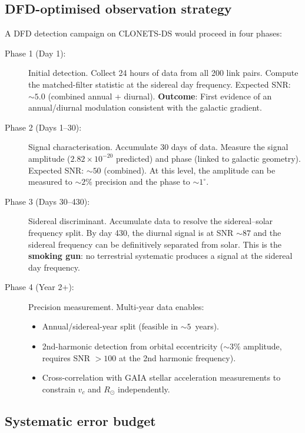 \documentclass[11pt]{article}
\newcommand{\ee}[1]{\times 10^{#1}}
\begin{document}
\subsection{DFD-optimised observation strategy}

A DFD detection campaign on CLONETS-DS would proceed in four phases:

\begin{description}
\item[Phase 1 (Day 1):] Initial detection. Collect 24 hours of data from
  all 200 link pairs. Compute the matched-filter statistic at the sidereal
  day frequency. Expected SNR: $\sim 5.0$ (combined annual + diurnal).
  \textbf{Outcome}: First evidence of an annual/diurnal modulation
  consistent with the galactic gradient.

\item[Phase 2 (Days 1--30):] Signal characterisation. Accumulate 30 days
  of data. Measure the signal amplitude ($2.82\ee{-20}$ predicted) and
  phase (linked to galactic geometry). Expected SNR: $\sim 50$
  (combined). At this level, the amplitude can be measured to $\sim 2\%$
  precision and the phase to $\sim 1^\circ$.

\item[Phase 3 (Days 30--430):] Sidereal discriminant. Accumulate data
  to resolve the sidereal--solar frequency split. By day 430, the
  diurnal signal is at SNR $\sim 87$ and the sidereal frequency can
  be definitively separated from solar. This is the \textbf{smoking gun}:
  no terrestrial systematic produces a signal at the sidereal day frequency.

\item[Phase 4 (Year 2+):] Precision measurement. Multi-year data enables:
  \begin{itemize}[nosep]
  \item Annual/sidereal-year split (feasible in $\sim 5$~years).
  \item 2nd-harmonic detection from orbital eccentricity ($\sim 3\%$
    amplitude, requires SNR $> 100$ at the 2nd harmonic frequency).
  \item Cross-correlation with GAIA stellar acceleration measurements
    to constrain $v_c$ and $R_\odot$ independently.
  \end{itemize}
\end{description}

\subsection{Systematic error budget}
\end{document}
